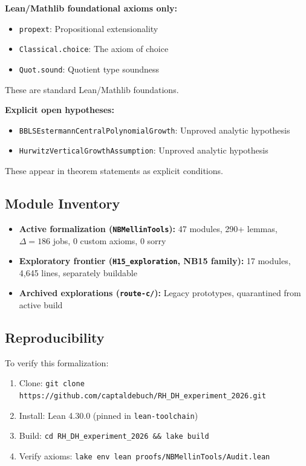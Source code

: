 \documentclass[11pt,a4paper]{article}
\theoremstyle{plain}
\theoremstyle{definition}
\theoremstyle{remark}
\begin{document}
\textbf{Lean/Mathlib foundational axioms only:}
\begin{itemize}[leftmargin=2em]
  \item \texttt{propext}: Propositional extensionality
  \item \texttt{Classical.choice}: The axiom of choice
  \item \texttt{Quot.sound}: Quotient type soundness
\end{itemize}

These are standard Lean/Mathlib foundations.

\textbf{Explicit open hypotheses:}
\begin{itemize}[leftmargin=2em]
  \item \texttt{BBLSEstermannCentralPolynomialGrowth}: Unproved analytic hypothesis
  \item \texttt{HurwitzVerticalGrowthAssumption}: Unproved analytic hypothesis
\end{itemize}

These appear in theorem statements as explicit conditions.

\subsection{Module Inventory}

\begin{itemize}[leftmargin=2em]
  \item \textbf{Active formalization (\texttt{NBMellinTools}):} 47 modules, 290+ lemmas, $\Delta = 186$ jobs, 0 custom axioms, 0 sorry
  \item \textbf{Exploratory frontier (\texttt{H15\_exploration}, NB15 family):} 17 modules, 4,645 lines, separately buildable
  \item \textbf{Archived explorations (\texttt{route-c/}):} Legacy prototypes, quarantined from active build
\end{itemize}

\subsection{Reproducibility}

To verify this formalization:

\begin{enumerate}[label=\textbf{\arabic*.}]
  \item Clone: \texttt{git clone https://github.com/captaldebuch/RH\_DH\_experiment\_2026.git}
  \item Install: Lean 4.30.0 (pinned in \texttt{lean-toolchain})
  \item Build: \texttt{cd RH\_DH\_experiment\_2026 \&\& lake build}
  \item Verify axioms: \texttt{lake env lean proofs/NBMellinTools/Audit.lean}
\end{enumerate}
\end{document}

